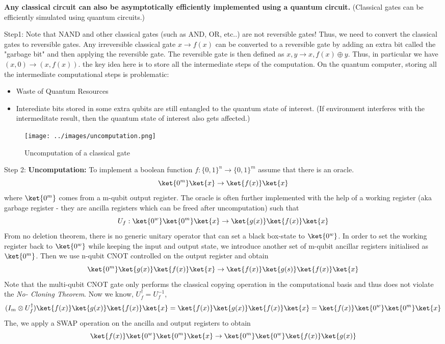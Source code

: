 \documentclass[12pt, oneside]{book}
\theoremstyle{definition}
\theoremstyle{definition}
\theoremstyle{remark}
\begin{document}
\textbf{Any classical circuit can also be asymptotically efficiently implemented using a quantum circuit.} (Classical gates can be efficiently
simulated using quantum circuits.)
 
Step1: Note that NAND and other classical gates (such as AND, OR, etc..) are not reversible gates! Thus, we need to convert the classical gates to reversible gates.
Any irreversible classical gate $x \rightarrow f(x)$ can be converted to a reversible gate by adding an extra bit called the "garbage bit" and then applying the reversible gate.
The reversible gate is then defined as $x,y \rightarrow x,f(x)\oplus y$.
Thus, in particular we have $(x,0) \rightarrow (x,f(x))$.
the key idea here is to store all the intermediate steps of the computation.
On the quantum computer, storing all the intermediate computational steps is problematic:
\begin{itemize}
    \item Waste of Quantum Resources
    \item Interediate bits stored in some extra qubits are still entangled to the quantum state of interest. (If environment interferes with the
    intermeditate result, then the quantum state of interest also gets affected.)
\end{itemize}
\begin{figure}[H]
    \centering
    \texttt{[image: ../images/uncomputation.png]}
    \caption{Uncomputation of a classical gate}
    \label{fig:uncomp}
\end{figure}

Step 2: \textbf{Uncomputation: }To implement a boolean function $f:\{0,1\}^n \rightarrow \{0,1\}^m$ assume that there is an oracle.
\[
\ket{0^m}\ket{x}\rightarrow \ket{f(x)}\ket{x}\]
where $\ket{0^m}$ comes from a m-qubit output register. The oracle is often further implemented
with the help of a working register (aka garbage register - they are ancilla registers which can be freed after uncomputation) such that
\[U_f:\ket{0^w}\ket{0^m}\ket{x}\rightarrow \ket{g(x)}\ket{f(x)}\ket{x}\]
From no deletion theorem, there is no generic unitary operator that can set a black box-state to $\ket{0^w}$.
In order to set the working register back to $\ket{0^w}$ while keeping the input and output state, we introduce another set of m-qubit ancillar registers
initialised as $\ket{0^m}$. Then we use n-qubit CNOT controlled on the output register and obtain
\[\ket{0^m}\ket{g(x)}\ket{f(x)}\ket{x} \rightarrow \ket{f(x)}\ket{g(s)}\ket{f(x)}\ket{x}\]
Note that the multi-qubit CNOT gate only performs the classical copying operation in the computational basis and thus does not violate 
the \textit{No- Cloning Theorem}.
Now we know, $U_f^{\dagger}=U_f^{-1}$,
\[ (I_m \otimes U_f^{\dagger})\ket{f(x)}\ket{g(x)}\ket{f(x)}\ket{x} = \ket{f(x)}\ket{g(x)}\ket{f(x)}\ket{x} =\ket{f(x)}\ket{0^w}\ket{0^m}\ket{x}\]
The, we apply a SWAP operation on the ancilla and output registers to obtain 
\[\ket{f(x)}\ket{0^w}\ket{0^m}\ket{x}\rightarrow\ket{0^m}\ket{0^w}\ket{f(x)}\ket{g(x)}\]
\end{document}
